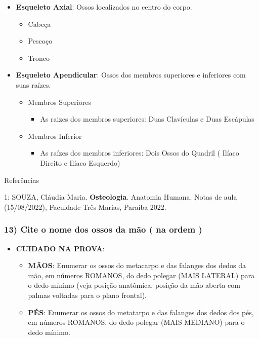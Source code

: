 \documentclass[
]{book}
\providecommand{\tightlist}{%
  \setlength{\itemsep}{0pt}\setlength{\parskip}{0pt}}
\begin{document}
\begin{itemize}
\tightlist
\item
  \textbf{Esqueleto Axial}: Ossos localizados no centro do corpo.

  \begin{itemize}
  \tightlist
  \item
    Cabeça
  \item
    Pescoço
  \item
    Tronco
  \end{itemize}
\item
  \textbf{Esqueleto Apendicular}: Ossos dos membros superiores e inferiores com suas raízes.

  \begin{itemize}
  \tightlist
  \item
    Membros Superiores

    \begin{itemize}
    \tightlist
    \item
      As raizes dos membros superiores: Duas Clavículas e Duas Escápulas
    \end{itemize}
  \item
    Membros Inferior

    \begin{itemize}
    \tightlist
    \item
      As raízes dos membros inferiores: Dois Ossos do Quadril ( Ilíaco Direito e Ilíaco Esquerdo)
    \end{itemize}
  \end{itemize}
\end{itemize}

Referências

1: SOUZA, Cláudia Maria. \textbf{Osteologia}. Anatomia Humana. Notas de aula (15/08/2022), Faculdade Três Marias, Paraíba 2022.

\hypertarget{cite-o-nome-dos-ossos-da-muxe3o-na-ordem}{%
\subsubsection*{13) Cite o nome dos ossos da mão ( na ordem )}\label{cite-o-nome-dos-ossos-da-muxe3o-na-ordem}}

\begin{itemize}
\tightlist
\item
  \textbf{CUIDADO NA PROVA}:

  \begin{itemize}
  \tightlist
  \item
    \textbf{MÃOS}: Enumerar os ossos do metacarpo e das falanges dos dedos da mão, em números ROMANOS, do dedo polegar (MAIS LATERAL) para o dedo mínimo (veja posição anatômica, posição da mão aberta com palmas voltadas para o plano frontal).
  \item
    \textbf{PÉS}: Enumerar os ossos do metatarpo e das falanges dos dedos dos pés, em números ROMANOS, do dedo polegar (MAIS MEDIANO) para o dedo mínimo.
  \end{itemize}
\end{itemize}
\end{document}
